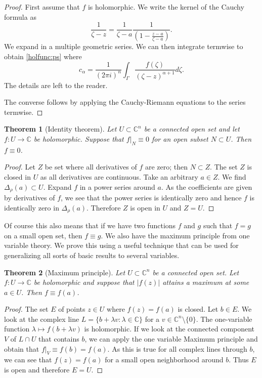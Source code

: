 \documentclass[12pt,openany]{book}
\newcommand{\abs}[1]{\left\lvert {#1} \right\rvert}
\newcommand{\C}{{\mathbb{C}}}
\newcommand{\myindex}[1]{#1\index{#1}}
\theoremstyle{plain}
\newtheorem{thm}{Theorem}[section]
\theoremstyle{remark}
\theoremstyle{definition}
\theoremstyle{exercise}
\theoremstyle{example}
\begin{document}
\begin{proof}
First assume that $f$ is holomorphic.  We write the kernel of the Cauchy
formula as
\begin{equation}
\frac{1}{\zeta-z} = \frac{1}{\zeta-a}\frac{1}{\left(1-\frac{z-a}{\zeta-a}\right)} .
\end{equation}
We expand in a multiple geometric series.  We can then
integrate termwise to obtain \eqref{holfunc:ps} where
\begin{equation}
c_\alpha
=
\frac{1}{{(2\pi i)}^n}
\int_{\Gamma}
\frac{f(\zeta)}{{(\zeta-z)}^{\alpha+1}}
d \zeta .
\end{equation}
The details are left to the reader.

The converse follows by applying the Cauchy-Riemann equations
to the series termwise.
\end{proof}

\begin{thm}[\myindex{Identity theorem}]
Let $U \subset \C^n$ be a connected open set and let
$f \colon U \to \C$ be holomorphic.  Suppose that
$f|_N \equiv 0$ for an open
subset $N \subset U$.
Then $f \equiv 0$.
\end{thm}

\begin{proof}
Let $Z$ be set where all derivatives of $f$ are zero; then
$N \subset Z$.  The set $Z$ is closed in $U$
as all derivatives are continuous.
Take an arbitrary $a \in Z$.
We find $\Delta_\rho(a) \subset U$.  Expand $f$
in a power series around $a$.  As the coefficients are given by derivatives 
of $f$, we see that the power series is identically zero and hence $f$ is
identically zero in $\Delta_\rho(a)$.  Therefore $Z$ is open in $U$ and
$Z = U$.
\end{proof}

Of course this also means that if we have two functions $f$ and $g$ such
that $f = g$ on a small open set, then $f \equiv g$.  We also have the
maximum principle from one variable theory.  We prove this using a useful
technique that can be used for generalizing all sorts of basic results
to several variables.

\begin{thm}[\myindex{Maximum principle}]
Let $U \subset \C^n$ be a connected open set.
Let $f \colon U \to \C$ be holomorphic and suppose that $\abs{f(z)}$
attains a maximum at some $a \in U$.  Then $f \equiv f(a)$.
\end{thm}

\begin{proof}
The set $E$ of points $z \in U$ where $f(z) = f(a)$ is closed.
Let $b \in E$.  We look at the complex line $L = \{ b + \lambda v : \lambda
\in \C \}$ for a $v \in \C^n \setminus \{ 0 \}$.
The one-variable function
$\lambda \mapsto f(b + \lambda v)$ is holomorphic.  If we look at the
connected component $V$ of $L \cap U$ that contains $b$, we can apply
the one variable Maximum principle and obtain that $f|_V \equiv f(b) = f(a)$.
As this is true for all complex lines through $b$, we can see that
$f(z) = f(a)$ for a small open neighborhood around $b$.  Thus $E$ is open
and therefore $E = U$.
\end{proof}
\end{document}
